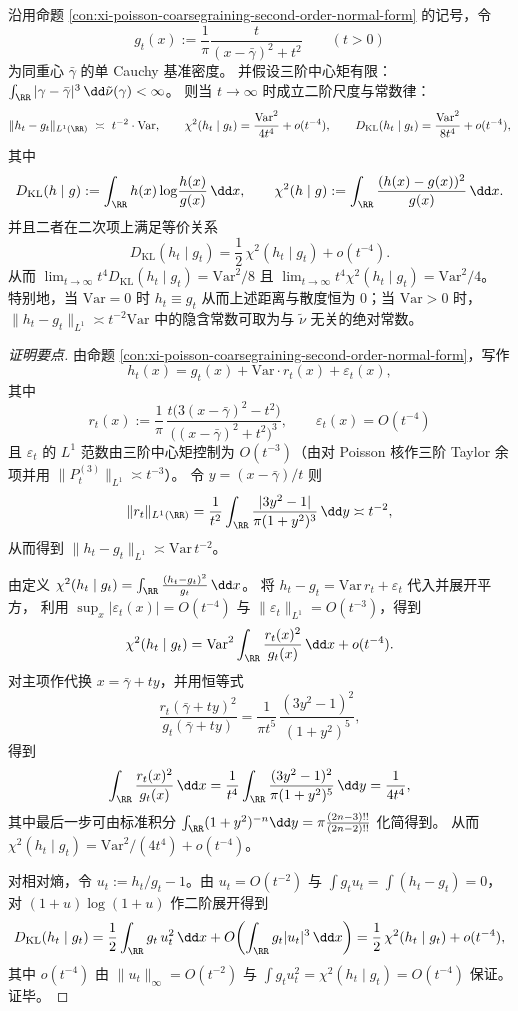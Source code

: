 \begin{proposition}\label{prop:xi-poisson-tv-kl-second-order}
沿用命题 \ref{con:xi-poisson-coarsegraining-second-order-normal-form} 的记号，令
\[
g_t(x):=\frac{1}{\pi}\frac{t}{(x-\bar\gamma)^2+t^2}
\qquad (t>0)
\]
为同重心 \(\bar\gamma\) 的单 Cauchy 基准密度。
并假设三阶中心矩有限：
\(
\int_{\RR}|\gamma-\bar\gamma|^3\,\dd\tilde\nu(\gamma)<\infty
\)。
则当 \(t\to\infty\) 时成立二阶尺度与常数律：
\[
\|h_t-g_t\|_{L^1(\RR)}\ \asymp\ t^{-2}\cdot \mathrm{Var},
\qquad
\chi^2(h_t\mid g_t)=\frac{\mathrm{Var}^2}{4t^4}+o(t^{-4}),
\qquad
D_{\mathrm{KL}}(h_t\mid g_t)=\frac{\mathrm{Var}^2}{8t^4}+o(t^{-4}),
\]
其中
\[
D_{\mathrm{KL}}(h\mid g):=\int_{\RR} h(x)\log\!\frac{h(x)}{g(x)}\,\dd x,
\qquad
\chi^2(h\mid g):=\int_{\RR}\frac{(h(x)-g(x))^2}{g(x)}\,\dd x.
\]
并且二者在二次项上满足等价关系
\[
D_{\mathrm{KL}}(h_t\mid g_t)=\frac12\,\chi^2(h_t\mid g_t)+o(t^{-4}).
\]
从而
\(
\lim_{t\to\infty} t^4D_{\mathrm{KL}}(h_t\mid g_t)=\mathrm{Var}^2/8
\)
且
\(
\lim_{t\to\infty} t^4\chi^2(h_t\mid g_t)=\mathrm{Var}^2/4
\)。
特别地，当 \(\mathrm{Var}=0\) 时 \(h_t\equiv g_t\) 从而上述距离与散度恒为 \(0\)；当 \(\mathrm{Var}>0\) 时，\(\|h_t-g_t\|_{L^1}\asymp t^{-2}\mathrm{Var}\) 中的隐含常数可取为与 \(\tilde\nu\) 无关的绝对常数。
\end{proposition}
\begin{proof}[证明要点]
由命题 \ref{con:xi-poisson-coarsegraining-second-order-normal-form}，写作
\[
h_t(x)=g_t(x)+\mathrm{Var}\cdot r_t(x)+\varepsilon_t(x),
\]
其中
\[
r_t(x):=\frac{1}{\pi}\,
\frac{t\bigl(3(x-\bar\gamma)^2-t^2\bigr)}{\bigl((x-\bar\gamma)^2+t^2\bigr)^3},
\qquad
\varepsilon_t(x)=O(t^{-4})
\]
且 \(\varepsilon_t\) 的 \(L^1\) 范数由三阶中心矩控制为 \(O(t^{-3})\)（由对 Poisson 核作三阶 Taylor 余项并用 \(\|P_t^{(3)}\|_{L^1}\asymp t^{-3}\)）。
令 \(y=(x-\bar\gamma)/t\) 则
\[
\|r_t\|_{L^1(\RR)}=\frac{1}{t^2}\int_{\RR}\frac{|3y^2-1|}{\pi(1+y^2)^3}\,\dd y
\asymp t^{-2},
\]
从而得到 \(\|h_t-g_t\|_{L^1}\asymp \mathrm{Var}\,t^{-2}\)。
\par
由定义
\(
\chi^2(h_t\mid g_t)=\int_{\RR}\frac{(h_t-g_t)^2}{g_t}\,\dd x
\)。
将 \(h_t-g_t=\mathrm{Var}\,r_t+\varepsilon_t\) 代入并展开平方，
利用 \(\sup_x|\varepsilon_t(x)|=O(t^{-4})\) 与 \(\|\varepsilon_t\|_{L^1}=O(t^{-3})\)，得到
\[
\chi^2(h_t\mid g_t)
=\mathrm{Var}^2\int_{\RR}\frac{r_t(x)^2}{g_t(x)}\,\dd x+o(t^{-4}).
\]
对主项作代换 \(x=\bar\gamma+ty\)，并用恒等式
\[
\frac{r_t(\bar\gamma+ty)^2}{g_t(\bar\gamma+ty)}=\frac{1}{\pi t^5}\,\frac{(3y^2-1)^2}{(1+y^2)^5},
\]
得到
\[
\int_{\RR}\frac{r_t(x)^2}{g_t(x)}\,\dd x
=\frac{1}{t^4}\int_{\RR}\frac{(3y^2-1)^2}{\pi(1+y^2)^5}\,\dd y
=\frac{1}{4t^4},
\]
其中最后一步可由标准积分
\(
\int_{\RR}(1+y^2)^{-n}\dd y=\pi\frac{(2n-3)!!}{(2n-2)!!}
\)
化简得到。
从而 \(\chi^2(h_t\mid g_t)=\mathrm{Var}^2/(4t^4)+o(t^{-4})\)。
\par
对相对熵，令 \(u_t:=h_t/g_t-1\)。由 \(u_t=O(t^{-2})\) 与 \(\int g_tu_t=\int(h_t-g_t)=0\)，
对 \((1+u)\log(1+u)\) 作二阶展开得到
\[
D_{\mathrm{KL}}(h_t\mid g_t)
=\frac12\int_{\RR} g_t\,u_t^2\,\dd x+O\!\left(\int_{\RR} g_t|u_t|^3\,\dd x\right)
=\frac12\,\chi^2(h_t\mid g_t)+o(t^{-4}),
\]
其中 \(o(t^{-4})\) 由 \(\|u_t\|_\infty=O(t^{-2})\) 与 \(\int g_tu_t^2=\chi^2(h_t\mid g_t)=O(t^{-4})\) 保证。
证毕。
\end{proof}
